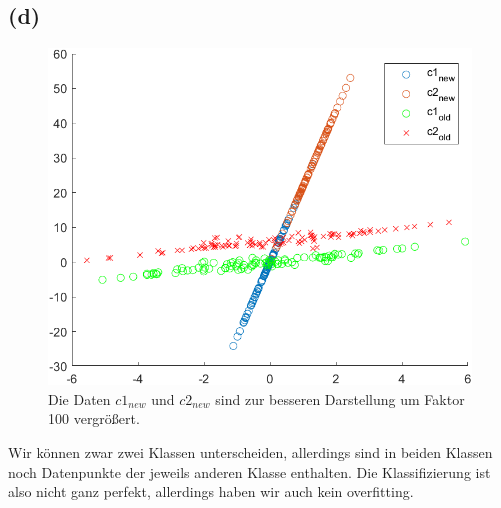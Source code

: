 \documentclass[a4paper]{scrartcl}
\newcounter{punkte}
\begin{document}
\subsection*{(d)}
\begin{figure}[H]
	\includegraphics*[scale=1]{assignment3_data/plots/q4_alle.png}
	\caption{Die Daten $c1_{new}$ und $c2_{new}$ sind zur besseren Darstellung um Faktor 100 vergrößert.}
\end{figure}
Wir können zwar zwei Klassen unterscheiden, allerdings sind in beiden Klassen noch Datenpunkte der jeweils anderen Klasse enthalten. Die Klassifizierung ist also nicht ganz perfekt, allerdings haben wir auch kein overfitting.
\end{document}
